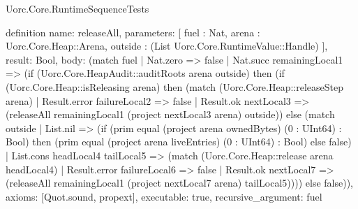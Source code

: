 \begin{lexlean}{Uorc.Core.RuntimeSequenceTests}
\begin{semanticmodule}
definition{
  name: releaseAll,
  parameters: [
    fuel : Nat,
    arena : Uorc.Core.Heap::Arena,
    outside : (List Uorc.Core.RuntimeValue::Handle)
  ],
  result: Bool,
  body: (match fuel
    | Nat.zero => false
    | Nat.succ remainingLocal1 => (if (Uorc.Core.HeapAudit::auditRoots arena outside) then (if (Uorc.Core.Heap::isReleasing arena) then (match (Uorc.Core.Heap::releaseStep arena)
      | Result.error failureLocal2 => false
      | Result.ok nextLocal3 => (releaseAll remainingLocal1 (project nextLocal3 arena) outside)) else (match outside
      | List.nil => (if (prim equal (project arena ownedBytes) (0 : UInt64) : Bool) then (prim equal (project arena liveEntries) (0 : UInt64) : Bool) else false)
      | List.cons headLocal4 tailLocal5 => (match (Uorc.Core.Heap::release arena headLocal4)
        | Result.error failureLocal6 => false
        | Result.ok nextLocal7 => (releaseAll remainingLocal1 (project nextLocal7 arena) tailLocal5)))) else false)),
  axioms: [Quot.sound, propext],
  executable: true,
  recursive_argument: fuel
}


\end{semanticmodule}
\end{lexlean}
